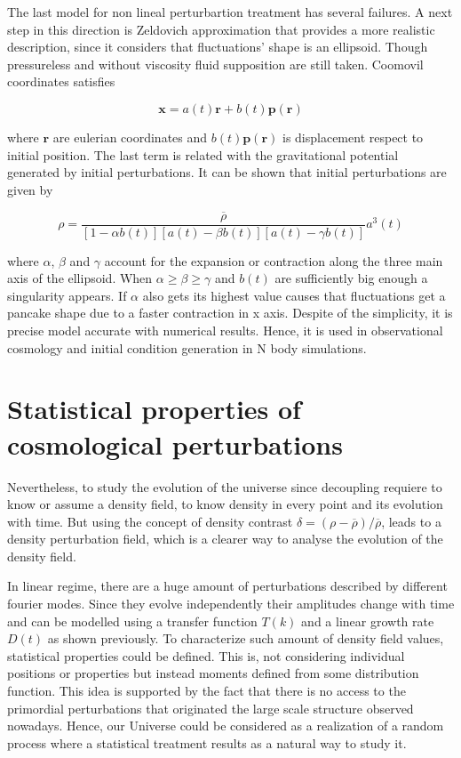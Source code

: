The last model for non lineal perturbartion treatment 
has several failures. A next step in this direction is 
Zeldovich approximation that provides a more realistic description, 
since it considers that fluctuations' shape is an ellipsoid.
Though pressureless and without viscosity fluid supposition are still taken.
Coomovil coordinates satisfies 

\[
\textbf{x} = a(t)\textbf{r}+b(t)\textbf{p}(\textbf{r})
\]

where $\textbf{r}$ are eulerian coordinates and $b(t)\textbf{p}(\textbf{r})$
is displacement respect to initial position. The last term is related 
with the gravitational potential generated by initial perturbations. 
It can be shown that initial perturbations are given by 

\[
\rho = \frac{\overline{\rho} }{[1-\alpha b(t)][a(t)-\beta b(t)][a(t)-\gamma b(t)]}a^3(t)
\]

where $\alpha$, $\beta$ and $\gamma$ account for the expansion or contraction 
along the three main axis of the ellipsoid. 
When  $\alpha \geq \beta \geq \gamma$ and $b(t)$ are sufficiently big enough a 
singularity appears. If $\alpha$ also gets its highest value causes that fluctuations
get a pancake shape due to a faster contraction in x axis. 
Despite of the simplicity, it is precise model accurate with numerical results. Hence,
it is used in observational cosmology and initial condition generation in N body
simulations. 

\section{ Statistical properties of cosmological perturbations }

Nevertheless, to study the evolution of the universe since decoupling requiere to know 
or assume a density field, to know density in every point and its evolution with time. 
But using the concept of density contrast $\delta = (\rho - \overline{\rho})/\overline{\rho}$, 
leads to a density perturbation field, which is a clearer way to analyse the evolution
of the density field.

In linear regime, there are a huge amount of perturbations described by different 
fourier modes. Since they evolve independently their amplitudes change with time and 
can be modelled using a transfer function $T(k)$ and a linear growth rate $D(t)$ as
shown previously. To characterize such amount of density field values, statistical 
properties could be defined. 
This is, not considering individual positions or properties but instead moments defined from
some distribution function. This idea is supported by the fact that there is no access 
to the primordial perturbations that originated the large scale structure observed 
nowadays. Hence, our Universe could be considered as a realization of a random process 
where a statistical treatment results as a natural way to study it. 

